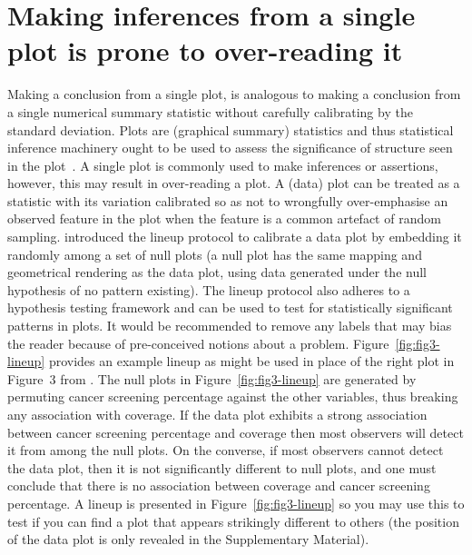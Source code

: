 \documentclass[ijds,nonblindrev]{informs-ijds}
\begin{document}
\section{Making inferences from a single plot is prone to over-reading it}\label{sec:visinf}

Making a conclusion from a single plot, is analogous to making a conclusion from a single numerical summary statistic without carefully calibrating by the standard deviation. Plots are (graphical summary) statistics and thus statistical inference machinery ought to be used to assess the significance of structure seen in the plot~\citep{wickham2010graphical}. A single plot is commonly used to make inferences or assertions, however, this may result in over-reading a plot. A (data) plot can be treated as a statistic with its variation calibrated so as not to wrongfully over-emphasise an observed feature in the plot when the feature is a common artefact of random sampling. \citet{buja2009statistical} introduced the lineup protocol to calibrate a data plot by embedding it randomly among a set of null plots (a null plot has the same mapping and geometrical rendering as the data plot, using data generated under the null hypothesis of no pattern existing). The lineup protocol also adheres to a hypothesis testing framework and can be used to test for statistically significant patterns in plots. It would be recommended to remove any labels that may bias the reader because of pre-conceived notions about a problem.  Figure~\ref{fig:fig3-lineup} provides an example lineup as might be used in place of the right plot in Figure~3 from \citet{basole2021}. The null plots in Figure~\ref{fig:fig3-lineup} are generated by permuting cancer screening percentage against the other variables, thus breaking any association with coverage. If the data plot exhibits a strong association between cancer screening percentage and coverage then most observers will detect it from among the null plots. On the converse, if most observers cannot detect the data plot, then it is not significantly different to null plots, and one must conclude that there is no association between coverage and cancer screening percentage. A lineup is presented in Figure~\ref{fig:fig3-lineup} so you may use this to test if you can find a plot that appears strikingly different to others (the position of the data plot is only revealed in the Supplementary Material).
\end{document}
